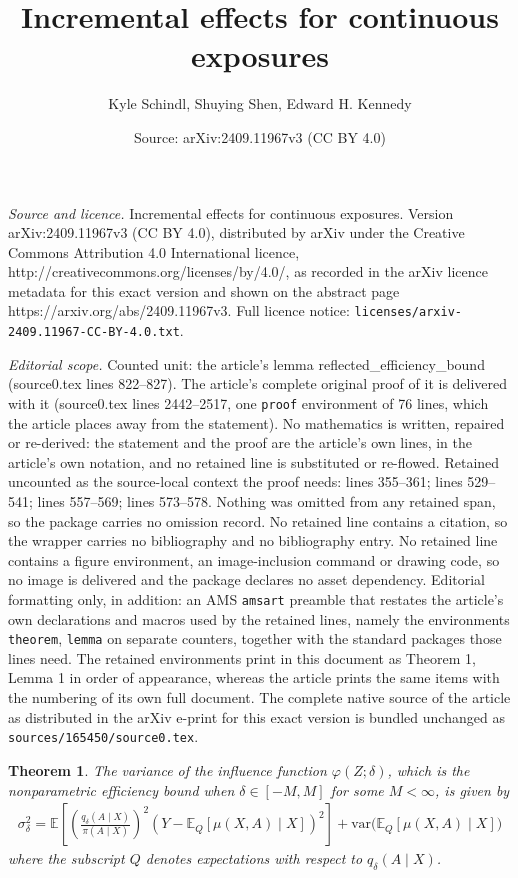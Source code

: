 \documentclass[10pt,a4paper]{amsart}
\title{\vspace*{-.4in} {Incremental effects for continuous exposures}}
\author{Kyle Schindl, Shuying Shen, Edward H. Kennedy}
\date{Source: arXiv:2409.11967v3 (CC BY 4.0)}
\newtheorem{theorem}{Theorem}
\newcommand{\var}{\text{var}}
\begin{document}
\maketitle

\noindent\emph{Source and licence.} \vspace*{-.4in} {Incremental effects for continuous exposures}. Version arXiv:2409.11967v3 (CC BY 4.0), distributed by arXiv under the Creative Commons Attribution 4.0 International licence, http://creativecommons.org/licenses/by/4.0/, as recorded in the arXiv licence metadata for this exact version and shown on the abstract page https://arxiv.org/abs/2409.11967v3. Full licence notice: \texttt{licenses/arxiv-2409.11967-CC-BY-4.0.txt}.\par\smallskip

\noindent\textit{Editorial scope.} Counted unit: the article's lemma reflected\_efficiency\_bound (source0.tex lines 822--827). The article's complete original proof of it is delivered with it (source0.tex lines 2442--2517, one \texttt{proof} environment of 76 lines, which the article places away from the statement). No mathematics is written, repaired or re-derived: the statement and the proof are the article's own lines, in the article's own notation, and no retained line is substituted or re-flowed.  Retained uncounted as the source-local context the proof needs: lines 355--361; lines 529--541; lines 557--569; lines 573--578.  Nothing was omitted from any retained span, so the package carries no omission record.  No retained line contains a citation, so the wrapper carries no bibliography and no bibliography entry.  No retained line contains a figure environment, an image-inclusion command or drawing code, so no image is delivered and the package declares no asset dependency.  Editorial formatting only, in addition: an AMS \texttt{amsart} preamble that restates the article's own declarations and macros used by the retained lines, namely the environments \texttt{theorem}, \texttt{lemma} on separate counters, together with the standard packages those lines need.  The retained environments print in this document as Theorem 1, Lemma 1 in order of appearance, whereas the article prints the same items with the numbering of its own full document.  The complete native source of the article as distributed in the arXiv e-print for this exact version is bundled unchanged as \texttt{sources/165450/source0.tex}.
\begin{theorem} \label{nonpar_efficiency_bound}
The variance of the influence function $\varphi(Z;\delta)$, which is the nonparametric efficiency bound when $\delta \in [-M,M]$ for some $M<\infty$, is given by
 \begin{align*}
    \sigma^2_\delta = \mathbb{E}\left[\left(\frac{q_\delta(A \mid X)}{\pi(A \mid X)} \right)^2 (Y - \mathbb{E}_Q\left[\mu(X, A) \mid X \right])^2 \right] + \var\Big( \mathbb{E}_Q\left[\mu(X, A) \mid X \right] \Big)
\end{align*}
where the subscript $Q$ denotes expectations with respect to $q_\delta(A \mid X)$. 
\end{theorem}
\end{document}
